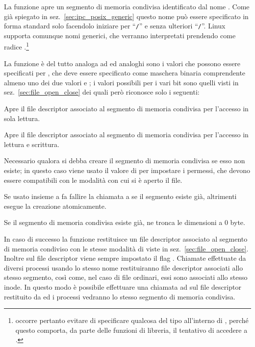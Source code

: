 La funzione apre un segmento di memoria condivisa identificato dal nome
. Come già spiegato in sez.~\ref{sec:ipc_posix_generic} questo
nome può essere specificato in forma standard solo facendolo iniziare per
``\texttt{/}'' e senza ulteriori ``\texttt{/}''. Linux supporta comunque nomi
generici, che verranno interpretati prendendo come radice
.\footnote{occorre pertanto evitare di specificare qualcosa del
  tipo  all'interno di , perché questo
  comporta, da parte delle funzioni di libreria, il tentativo di accedere a
  .}

La funzione è del tutto analoga ad  ed analoghi sono i valori che
possono essere specificati per , che deve essere specificato come
maschera binaria comprendente almeno uno dei due valori  e
; i valori possibili per i vari bit sono quelli visti in
sez.~\ref{sec:file_open_close} dei quali però  riconosce solo
i seguenti:
\begin{basedescript}{\desclabelwidth{2.0cm}\desclabelstyle{\nextlinelabel}}
\item[\const{O\_RDONLY}] Apre il file descriptor associato al segmento di
  memoria condivisa per l'accesso in sola lettura.
\item[\const{O\_RDWR}] Apre il file descriptor associato al segmento di
  memoria condivisa per l'accesso in lettura e scrittura.
\item[\const{O\_CREAT}] Necessario qualora si debba creare il segmento di
  memoria condivisa se esso non esiste; in questo caso viene usato il valore
  di  per impostare i permessi, che devono essere compatibili con
  le modalità con cui si è aperto il file.
\item[\const{O\_EXCL}] Se usato insieme a  fa fallire la
  chiamata a  se il segmento esiste già, altrimenti esegue la
  creazione atomicamente.
\item[\const{O\_TRUNC}] Se il segmento di memoria condivisa esiste già, ne
  tronca le dimensioni a 0 byte.
\end{basedescript}

In caso di successo la funzione restituisce un file descriptor associato al
segmento di memoria condiviso con le stesse modalità di  viste in
sez.~\ref{sec:file_open_close}. Inoltre sul file descriptor viene sempre
impostato il flag .  Chiamate effettuate da diversi
processi usando lo stesso nome restituiranno file descriptor associati allo
stesso segmento, così come, nel caso di file ordinari, essi sono associati
allo stesso inode. In questo modo è possibile effettuare una chiamata ad
 sul file descriptor restituito da  ed i processi
vedranno lo stesso segmento di memoria condivisa.

